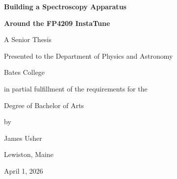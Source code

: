 \documentclass[../main]{subfiles}
\begin{document}


\vspace*{4cm} 

\centerline{\LARGE \textbf{Building a Spectroscopy Apparatus}}
\centerline{\LARGE \textbf{Around the FP4209 InstaTune} }
\bigskip\bigskip
\centerline{ A Senior Thesis}
\medskip
\centerline{ Presented to the Department of Physics and Astronomy}
\medskip
\centerline{Bates College}
\medskip
\centerline{in partial fulfillment of the requirements for the}
\medskip
\centerline{ Degree of Bachelor of Arts}
\medskip
\centerline{by}
\medskip
\centerline{\Large James Usher}
\medskip
\centerline{ Lewiston, Maine}
\medskip
\centerline{ April 1, 2026}

\newpage
\end{document}
